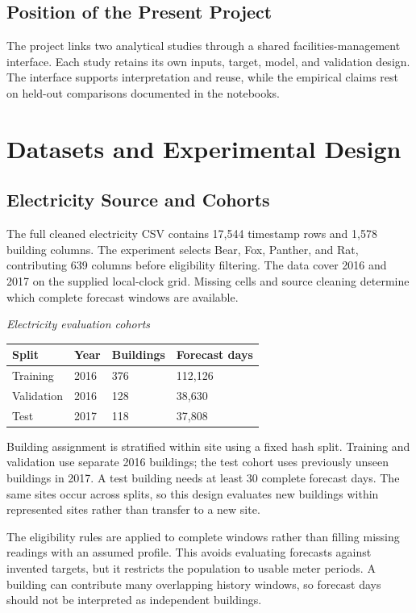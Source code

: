 \documentclass[12pt,a4paper]{article}
\begin{document}
\subsection{Position of the Present Project}
The project links two analytical studies through a shared facilities-management interface. Each study retains its own inputs, target, model, and validation design. The interface supports interpretation and reuse, while the empirical claims rest on held-out comparisons documented in the notebooks.

\newpage
\section{Datasets and Experimental Design}
\subsection{Electricity Source and Cohorts}
The full cleaned electricity CSV contains 17,544 timestamp rows and 1,578 building columns. The experiment selects Bear, Fox, Panther, and Rat, contributing 639 columns before eligibility filtering. The data cover 2016 and 2017 on the supplied local-clock grid. Missing cells and source cleaning determine which complete forecast windows are available.

\begin{center}\small
\textit{Electricity evaluation cohorts}\par\medskip
\begin{tabularx}{\textwidth}{XXXX}
\toprule
\textbf{Split} & \textbf{Year} & \textbf{Buildings} & \textbf{Forecast days}\\\midrule
Training & 2016 & 376 & 112,126\\
Validation & 2016 & 128 & 38,630\\
Test & 2017 & 118 & 37,808\\
\bottomrule\end{tabularx}\end{center}
Building assignment is stratified within site using a fixed hash split. Training and validation use separate 2016 buildings; the test cohort uses previously unseen buildings in 2017. A test building needs at least 30 complete forecast days. The same sites occur across splits, so this design evaluates new buildings within represented sites rather than transfer to a new site.

The eligibility rules are applied to complete windows rather than filling missing readings with an assumed profile. This avoids evaluating forecasts against invented targets, but it restricts the population to usable meter periods. A building can contribute many overlapping history windows, so forecast days should not be interpreted as independent buildings.
\end{document}
